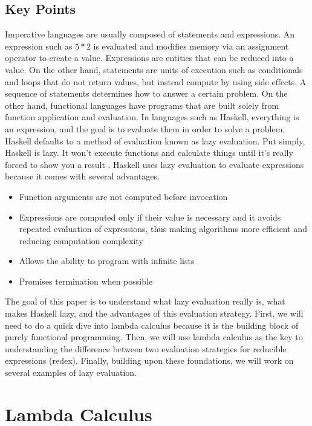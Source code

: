 \documentclass{article}
\begin{document}
\subsection{Key Points}

\medskip\noindent
Imperative languages are usually composed of statements and expressions. An expression such as $5 * 2$ is evaluated and modifies memory via an assignment operator to create a value. Expressions are entities that can be reduced into a value. On the other hand, statements are units of execution such as conditionals and loops that do not return values, but instead compute by using side effects. A sequence of statements determines how to answer a certain problem. On the other hand, functional languages have programs that are built solely from function application and evaluation. In languages such as Haskell, everything is an expression, and the goal is to evaluate them in order to solve a problem. Haskell defaults to a method of evaluation known as lazy evaluation. Put simply, Haskell is lazy. It won’t execute functions and calculate things until it’s really forced to show you a result \cite{LYAH}. Haskell uses lazy evaluation to evaluate expressions because it comes with several advantages. 

\begin{itemize}
    \item Function arguments are not computed before invocation
    \item Expressions are computed only if their value is necessary and it avoids repeated evaluation of expressions, thus making algorithms more efficient and reducing computation complexity
    \item Allows the ability to program with infinite lists
    \item Promises termination when possible  

\end{itemize}

\medskip\noindent
The goal of this paper is to understand what lazy evaluation really is, what makes Haskell lazy, and the advantages of this evaluation strategy. First, we will need to do a quick dive into lambda calculus because it is the building block of purely functional programming. Then, we will use lambda calculus as the key to understanding the difference between two evaluation strategies for reducible expressions (redex). Finally, building upon these foundations, we will work on several examples of lazy evaluation. 

\section{Lambda Calculus}
\end{document}
